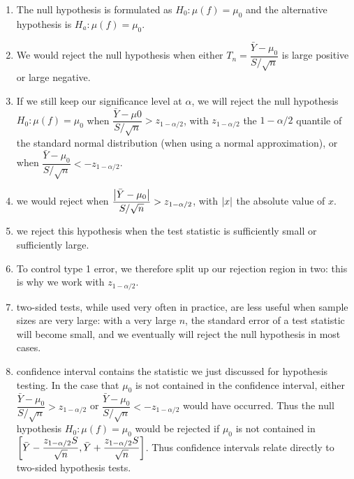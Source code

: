 \begin{enumerate}
    \item The null hypothesis is formulated as $H_0 : \mu( f ) = \mu_0$ and the alternative hypothesis is $H_a : \mu( f )  = \mu_0 $.
    \hfill \cite{statistics/book/Statistics-for-Data-Scientists/Maurits-Kaptein}

    \item We would reject the null hypothesis when either $T_n = \dfrac{\bar{Y} - \mu_0}{S/\sqrt{n}}$ is large positive or large negative.
    \hfill \cite{statistics/book/Statistics-for-Data-Scientists/Maurits-Kaptein}

    \item If we still keep our significance level at $\alpha$, we will reject the null hypothesis $H_0 : \mu( f )  = \mu_0$ when $\dfrac{\bar{Y} - \mu0}{S/\sqrt{n}} > z_{1-\alpha/2} $, with $z_{1-\alpha/2}$ the $1 - \alpha/2$ quantile of the standard normal distribution (when using a normal approximation), or when $\dfrac{\bar{Y} - \mu_0}{S/\sqrt{n}} < -z_{1-\alpha/2} $.
    \hfill \cite{statistics/book/Statistics-for-Data-Scientists/Maurits-Kaptein}

    \item we would reject when $\dfrac{\left| \bar{Y} - \mu_0 \right|}{S/\sqrt{n}} > z_{1-\alpha/2} $, with $\left| x \right|$ the absolute value of $x$.
    \hfill \cite{statistics/book/Statistics-for-Data-Scientists/Maurits-Kaptein}

    \item we reject this hypothesis when the test statistic is sufficiently small or sufficiently large.
    \hfill \cite{statistics/book/Statistics-for-Data-Scientists/Maurits-Kaptein}

    \item To control type 1 error, we therefore split up our rejection region in two: this is why we work with $z_{1-\alpha/2}$.
    \hfill \cite{statistics/book/Statistics-for-Data-Scientists/Maurits-Kaptein}

    \item  two-sided tests, while used very often in practice, are less useful when sample sizes are very large: with a very large $n$, the standard error of a test statistic will become small, and we eventually will reject the null hypothesis in most cases.
    \hfill \cite{statistics/book/Statistics-for-Data-Scientists/Maurits-Kaptein}

    \item confidence interval contains the statistic we just discussed for hypothesis testing. 
    In the case that $\mu_0$ is not contained in the confidence interval, either $\dfrac{\bar{Y} - \mu_0}{S/\sqrt{n}} > z_{1-\alpha/2}$ or $\dfrac{\bar{Y} - \mu_0}{S/\sqrt{n}} < -z_{1-\alpha/2}$ would have occurred.
    Thus the null hypothesis $H_0 : \mu( f ) = \mu_0$ would be rejected if $\mu_0$ is not contained in $\left[\bar{Y} - \dfrac{z_{1-\alpha/2} S}{\sqrt{n}}, \bar{Y} + \dfrac{z_{1-\alpha/2} S}{\sqrt{n}}\right]$. Thus confidence intervals relate directly to two-sided hypothesis tests.
    \hfill \cite{statistics/book/Statistics-for-Data-Scientists/Maurits-Kaptein}


\end{enumerate}
